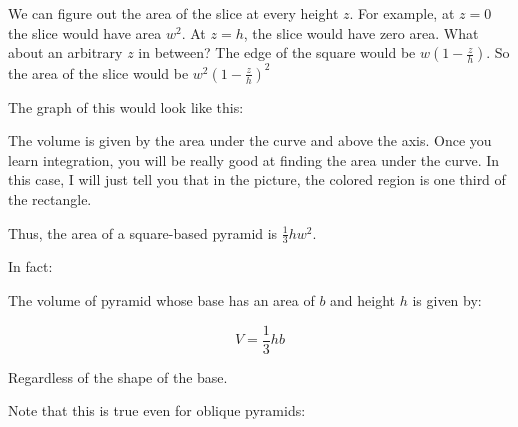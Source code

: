 We can figure out the area of the slice at every height $z$.  For
example, at $z = 0$ the slice would have area $w^2$.  At $z = h$, the
slice would have zero area.  What about an arbitrary $z$ in between?
The edge of the square would be $w (1 - \frac{z}{h})$.  So the area of
the slice would be $w^2 (1 - \frac{z}{h})^2$

The graph of this would look like this:


The volume is given by the area under the curve and above the
axis. Once you learn integration, you will be really good at finding
the area under the curve.  In this case, I will just tell you that in
the picture, the colored region is one third of the rectangle.

Thus, the area of a square-based pyramid is $\frac{1}{3} h w^2$.

In fact:

\begin{mdframed}[style=important, frametitle={Volume of a pyramid}]

  The volume of pyramid whose base has an area of $b$ and height $h$ is given by:

  $$V = \frac{1}{3} h b$$

  Regardless of the shape of the base.
\end{mdframed}

Note that this is true even for oblique pyramids:

